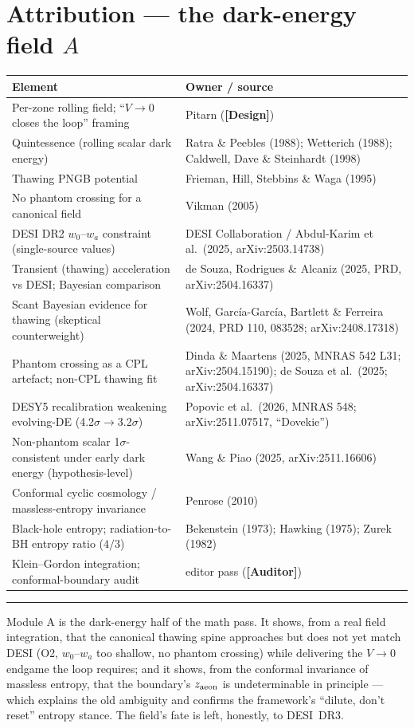 \documentclass[11pt]{article}
\newcommand{\Design}{\textbf{\textcolor{purple!65!black}{[Design]}}}
\newcommand{\Auditor}{\textbf{\textcolor{teal!55!black}{[Auditor]}}}
\begin{document}
\section{Attribution --- the dark-energy field $A$}
\begin{center}\small
\begin{tabular}{@{}p{}p{}@{}}
\toprule
Element & Owner / source \\
\midrule
Per-zone rolling field; ``$V\!\to\!0$ closes the loop'' framing & Pitarn (\Design) \\
Quintessence (rolling scalar dark energy) & Ratra \& Peebles (1988); Wetterich (1988); Caldwell, Dave \& Steinhardt (1998) \\
Thawing PNGB potential & Frieman, Hill, Stebbins \& Waga (1995) \\
No phantom crossing for a canonical field & Vikman (2005) \\
DESI DR2 $w_0$--$w_a$ constraint (single-source values) & DESI Collaboration / Abdul-Karim et al.\ (2025, arXiv:2503.14738) \\
Transient (thawing) acceleration vs DESI; Bayesian comparison & de Souza, Rodrigues \& Alcaniz (2025, PRD, arXiv:2504.16337) \\
Scant Bayesian evidence for thawing (skeptical counterweight) & Wolf, Garc\'ia-Garc\'ia, Bartlett \& Ferreira (2024, PRD 110, 083528; arXiv:2408.17318) \\
Phantom crossing as a CPL artefact; non-CPL thawing fit & Dinda \& Maartens (2025, MNRAS 542 L31; arXiv:2504.15190); de Souza et al.\ (2025; arXiv:2504.16337) \\
DESY5 recalibration weakening evolving-DE (4.2$\sigma\!\to\!$3.2$\sigma$) & Popovic et al.\ (2026, MNRAS 548; arXiv:2511.07517, ``Dovekie'') \\
Non-phantom scalar 1$\sigma$-consistent under early dark energy (hypothesis-level) & Wang \& Piao (2025, arXiv:2511.16606) \\
Conformal cyclic cosmology / massless-entropy invariance & Penrose (2010) \\
Black-hole entropy; radiation-to-BH entropy ratio ($4/3$) & Bekenstein (1973); Hawking (1975); Zurek (1982) \\
Klein--Gordon integration; conformal-boundary audit & editor pass (\Auditor) \\
\bottomrule
\end{tabular}
\end{center}

\vspace{4pt}\hrule\vspace{4pt}
{\small Module A is the dark-energy half of the math pass. It shows, from a real field integration, that the canonical thawing spine approaches but does not yet match DESI (O2, $w_0$--$w_a$ too shallow, no phantom crossing) while delivering the $V\!\to\!0$ endgame the loop requires; and it shows, from the conformal invariance of massless entropy, that the boundary's $z_{\rm aeon}$ is undeterminable in principle --- which explains the old ambiguity and confirms the framework's ``dilute, don't reset'' entropy stance. The field's fate is left, honestly, to DESI~DR3.}
\end{document}
